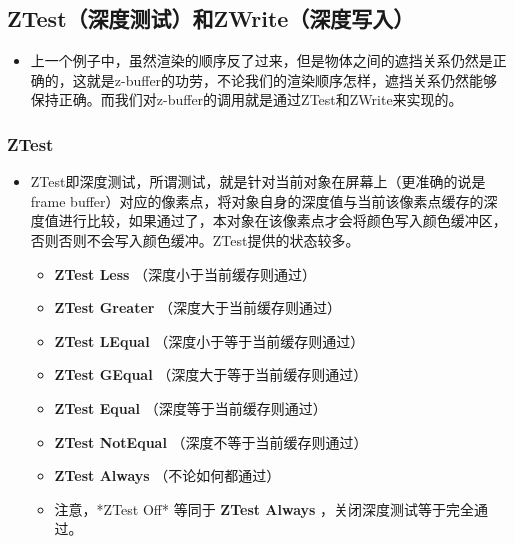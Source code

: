 \documentclass[9pt, b5paper]{article}
\begin{document}
\subsection{ZTest（深度测试）和ZWrite（深度写入） }
\label{sec-2-6}
\begin{itemize}
\item 上一个例子中，虽然渲染的顺序反了过来，但是物体之间的遮挡关系仍然是正确的，这就是z-buffer的功劳，不论我们的渲染顺序怎样，遮挡关系仍然能够保持正确。而我们对z-buffer的调用就是通过ZTest和ZWrite来实现的。
\end{itemize}
\subsubsection{ZTest}
\label{sec-2-6-1}
\begin{itemize}
\item ZTest即深度测试，所谓测试，就是针对当前对象在屏幕上（更准确的说是frame buffer）对应的像素点，将对象自身的深度值与当前该像素点缓存的深度值进行比较，如果通过了，本对象在该像素点才会将颜色写入颜色缓冲区，否则否则不会写入颜色缓冲。ZTest提供的状态较多。
\begin{itemize}
\item \textbf{ZTest Less} （深度小于当前缓存则通过）
\item \textbf{ZTest Greater} （深度大于当前缓存则通过）
\item \textbf{ZTest LEqual} （深度小于等于当前缓存则通过）
\item \textbf{ZTest GEqual} （深度大于等于当前缓存则通过）
\item \textbf{ZTest Equal} （深度等于当前缓存则通过）
\item \textbf{ZTest NotEqual} （深度不等于当前缓存则通过）
\item \textbf{ZTest Always} （不论如何都通过）
\item 注意，*ZTest Off* 等同于 \textbf{ZTest Always} ，关闭深度测试等于完全通过。
\end{itemize}
\end{itemize}
\end{document}
